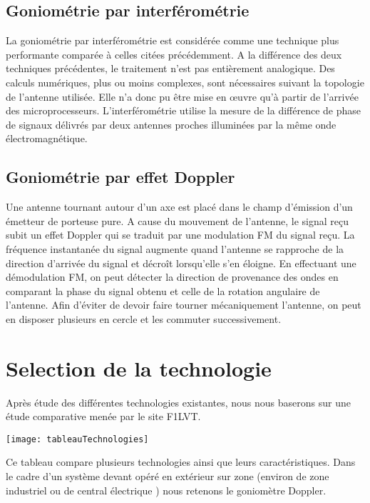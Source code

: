\subsection{Goniométrie par interférométrie}

	La goniométrie par interférométrie est considérée comme une technique plus performante comparée à celles citées précédemment. A la différence des deux techniques précédentes, le traitement n’est pas entièrement analogique. Des calculs numériques, plus ou moins complexes, sont nécessaires suivant la topologie de l’antenne utilisée. Elle n’a donc pu être mise en œuvre qu’à partir de l’arrivée des microprocesseurs.
L’interférométrie utilise la mesure de la différence de phase de signaux délivrés par deux antennes proches illuminées par la même onde électromagnétique.

\subsection{Goniométrie par effet Doppler}

	Une antenne tournant autour d'un axe est placé dans le champ d'émission d'un émetteur de porteuse pure. A cause du mouvement de l'antenne, le signal reçu subit un effet Doppler qui se traduit par une modulation FM du signal reçu. La fréquence instantanée du signal augmente quand l’antenne se rapproche de la direction d’arrivée du signal et décroît lorsqu’elle s’en éloigne. En effectuant une démodulation FM, on peut détecter la direction de provenance des ondes en comparant la phase du signal obtenu et celle de la rotation angulaire de l’antenne. 
Afin d'éviter de devoir faire tourner mécaniquement l'antenne, on peut en disposer plusieurs en cercle et les commuter successivement.

\section{Selection de la technologie}

	Après étude des différentes technologies existantes, nous nous baserons sur une étude comparative menée par le site F1LVT.
	
	\texttt{[image: tableauTechnologies]}
\parindent=15pt


	Ce tableau compare plusieurs technologies ainsi que leurs caractéristiques. Dans le cadre d’un système devant opéré en extérieur sur zone (environ de zone industriel ou de central électrique ) nous retenons le goniomètre Doppler.





